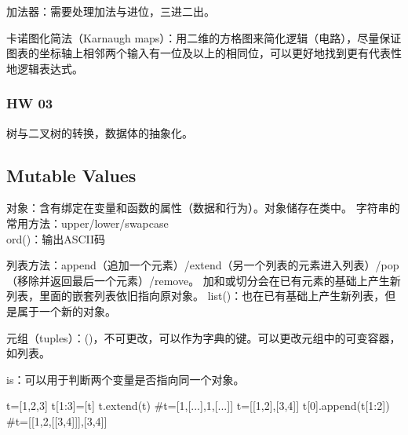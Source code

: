 \documentclass{ctexart}
\begin{document}
加法器：需要处理加法与进位，三进二出。

卡诺图化简法（Karnaugh maps）：用二维的方格图来简化逻辑（电路），尽量保证图表的坐标轴上相邻两个输入有一位及以上的相同位，可以更好地找到更有代表性地逻辑表达式。

\subsubsection{HW 03}

树与二叉树的转换，数据体的抽象化。

\subsection{Mutable Values}

对象：含有绑定在变量和函数的属性（数据和行为）。对象储存在类中。
字符串的常用方法：upper/lower/swapcase
\\ord()：输出ASCII码

列表方法：append（追加一个元素）/extend（另一个列表的元素进入列表）/pop（移除并返回最后一个元素）/remove。
加和或切分会在已有元素的基础上产生新列表，里面的嵌套列表依旧指向原对象。
list()：也在已有基础上产生新列表，但是属于一个新的对象。

元组（tuples）：()，不可更改，可以作为字典的键。可以更改元组中的可变容器，如列表。

is：可以用于判断两个变量是否指向同一个对象。

\begin{python}
    t=[1,2,3]
    t[1:3]=[t]
    t.extend(t)
    #t=[1,[...],1,[...]]
    t=[[1,2],[3,4]]
    t[0].append(t[1:2])
    #t=[[1,2,[[3,4]]],[3,4]]
\end{python}
\end{document}
